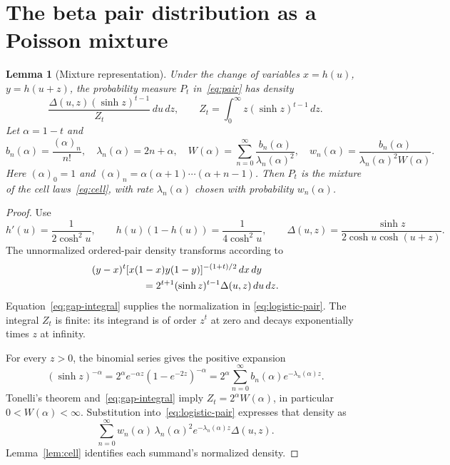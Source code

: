 \documentclass[11pt]{article}
\newtheorem{lemma}[theorem]{Lemma}
\theoremstyle{remark}
\newcommand{\dd}{\,d}
\begin{document}
\section{The beta pair distribution as a Poisson mixture}

\begin{lemma}[Mixture representation]\label{lem:mixture}
Under the change of variables $x=h(u)$, $y=h(u+z)$, the probability
measure $P_t$ in~\eqref{eq:pair} has density
\begin{equation}\label{eq:logistic-pair}
 \frac{\Delta(u,z)(\sinh z)^{t-1}}{Z_t}\dd u\dd z,
 \qquad
 Z_t=\int_0^\infty z(\sinh z)^{t-1}\dd z.
\end{equation}
Let $\alpha=1-t$ and
\begin{equation}\label{eq:weights}
 b_n(\alpha)=\frac{(\alpha)_n}{n!},\quad
 \lambda_n(\alpha)=2n+\alpha,\quad
 W(\alpha)=\sum_{n=0}^\infty\frac{b_n(\alpha)}{\lambda_n(\alpha)^2},
 \quad
 w_n(\alpha)=\frac{b_n(\alpha)}{\lambda_n(\alpha)^2W(\alpha)}.
\end{equation}
Here $(\alpha)_0=1$ and $(\alpha)_n=\alpha(\alpha+1)\cdots(\alpha+n-1)$.
Then $P_t$ is the mixture of the cell laws~\eqref{eq:cell}, with rate
$\lambda_n(\alpha)$ chosen with probability $w_n(\alpha)$.
\end{lemma}

\begin{proof}
Use
\[
 h'(u)=\frac{1}{2\cosh^2u},\qquad
 h(u)(1-h(u))=\frac{1}{4\cosh^2u},\qquad
 \Delta(u,z)=\frac{\sinh z}{2\cosh u\cosh(u+z)}.
\]
The unnormalized ordered-pair density transforms according to
\begin{align*}
 &(y-x)^t[x(1-x)y(1-y)]^{-(1+t)/2}\dd x\dd y\\
 &\hspace{18mm}=2^{t+1}(\sinh z)^{t-1}\Delta(u,z)\dd u\dd z.
\end{align*}
Equation~\eqref{eq:gap-integral} supplies the normalization in
\eqref{eq:logistic-pair}. The integral $Z_t$ is finite: its integrand
is of order $z^t$ at zero and decays exponentially times $z$ at infinity.

For every $z>0$, the binomial series gives the positive expansion
\begin{equation}\label{eq:binomial}
 (\sinh z)^{-\alpha}
 =2^\alpha e^{-\alpha z}(1-e^{-2z})^{-\alpha}
 =2^\alpha\sum_{n=0}^\infty b_n(\alpha)e^{-\lambda_n(\alpha)z}.
\end{equation}
Tonelli's theorem and~\eqref{eq:gap-integral} imply
$Z_t=2^\alpha W(\alpha)$, in particular $0<W(\alpha)<\infty$.
Substitution into~\eqref{eq:logistic-pair} expresses that density as
\[
 \sum_{n=0}^\infty w_n(\alpha)\,
 \lambda_n(\alpha)^2e^{-\lambda_n(\alpha)z}\Delta(u,z).
\]
Lemma~\ref{lem:cell} identifies each summand's normalized density.
\end{proof}
\end{document}
